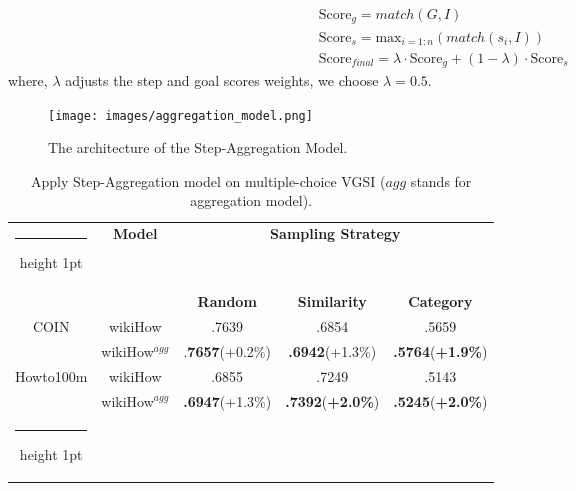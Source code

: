 \documentclass[11pt]{article}
\makeatletter
\newcommand{\thickhline}{\noalign {\ifnum 0=`}\fi \hrule height 1pt
    \futurelet \reserved@a \@xhline
}
\makeatother
\begin{document}
\begin{equation}
\begin{split}
    &\mathrm{Score}_{g} = match(G, I) \\
    &\mathrm{Score}_{s} = \mathrm{max}_{i = 1:n}(match(s_i, I)) \\
    &\mathrm{Score}_{final} = \lambda \cdot \mathrm{Score}_{g} + (1 - \lambda) \cdot \mathrm{Score}_{s}
\end{split}
\end{equation}
where, $\lambda$ adjusts the step and goal scores weights, we choose $\lambda = 0.5$.

\begin{figure*}[!t]
\centering
    \texttt{[image: images/aggregation\_model.png]}
    \caption{The architecture of the Step-Aggregation Model.}
    \label{fig:aggregation model}
\end{figure*}

\begin{table*}[!t]

\centering
\begin{tabular}{c|c|ccc}
\thickhline
\multirow{2}{*}{\textbf{Dataset}}   & \multirow{2}{*}{\textbf{Model}}           & \multicolumn{3}{c}{\textbf{Sampling Strategy}}        \\ \cline{3-5} 
                           &                                  & \textbf{Random}        & \textbf{Similarity}    & \textbf{Category}      \\ \hline
\multirow{2}{*}{COIN}      & wikiHow                          & .7639         & .6854         & .5659         \\
                           & wikiHow$^{agg}$ & .\textbf{7657}(+0.2\%) & \textbf{.6942}(+1.3\%) & \textbf{.5764}(\textbf{+1.9\%}) \\ \hline \hline
\multirow{2}{*}{Howto100m} & wikiHow                          & .6855         & .7249         & .5143         \\
                           & wikiHow$^{agg}$ & \textbf{.6947}(+1.3\%) & \textbf{.7392}(\textbf{+2.0\%}) & \textbf{.5245}(\textbf{+2.0\%}) \\ \thickhline
\end{tabular}
\caption{Apply Step-Aggregation model on multiple-choice VGSI ($agg$ stands for aggregation model).}
\label{agg multi}
\end{table*}
\end{document}
